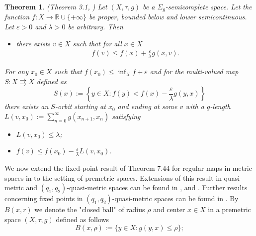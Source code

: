 \documentclass{article}
\def\ds{\displaystyle}
\def\text#1{\,\;\hbox{#1}\;\,}
\newcommand{\R}{\mathbb{R}}
\newtheorem{theo}{Theorem}[section]
\newtheorem{defi}[theo]{Definition}
\begin{document}
\begin{theo} \label{th:Ekeland} (Theorem 3.1, \cite{KZ}) 
Let $(X,\tau,g)$ be a  $\Sigma_g$-semicomplete space. Let the function $f: X \rightarrow \R \cup \{+\infty\}$ be proper,  bounded below and lower semicontinuous. Let $\varepsilon>0$ and $\lambda>0$ be arbitrary.   Then
\begin{itemize}
\item[\emph{(j)}] there exists $v \in X$ such that for all $x \in X$
\begin{eqnarray}
f(v) \leq f(x)+\frac{\varepsilon}{\lambda} g(x,v).  \label{eq:Ekeland}
\end{eqnarray}
\end{itemize}
For any $x_0 \in X$  such that $f(x_0) \le \inf_X f + \varepsilon $ and  for the multi-valued map $S :X \rightrightarrows X$ defined as
\[S (x):=\left\{y \in X: f(y)<f(x)-\frac{\varepsilon}{\lambda} g(y,x)\right\}\]
there exists an $S$-orbit starting at $x_0$ and ending at some $v$ with a $g$-length $\ds L(v,x_0):=\sum^{\infty}_{n= 0}g(x_{n+1},x_n)$ satisfying
\begin{itemize}
\item[\emph{(jj)}] $L(v, x_0) \leq \lambda$;
\item[\emph{(jjj)}] $\ds f(v) \leq f(x_0) - \frac{\varepsilon}{\lambda} L(v,x_0)$.
\end{itemize}
\end{theo}






We now extend the fixed-point result of Theorem 7.44 for regular maps in metric spaces in \cite{Io} to the setting of premetric spaces. Extensions of this result in quasi-metric and $(q_1,q_2)$-quasi-metric spaces can be found in \cite{TT1}, \cite{TT2} and \cite{asym}. Further results concerning fixed points in $(q_1, q_2)$-quasi-metric spaces can be found in \cite{IDRZ}. By $B(x,r)$ we denote the "closed ball" of radius $\rho$ and center $x \in X$ in a premetric space $(X, \tau, g)$ defined as follows
$$B(x,\rho):=\{y \in X: g(y,x) \leq \rho\};$$
\end{document}
